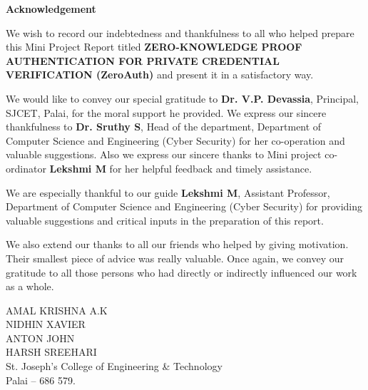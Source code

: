 \newpage
\thispagestyle{empty}
\begin{center}
{\LARGE\textbf{Acknowledgement}}\\[1cm]
\end{center}

We wish to record our indebtedness and thankfulness to all who helped prepare this Mini Project Report titled \textbf{ZERO-KNOWLEDGE PROOF AUTHENTICATION FOR PRIVATE CREDENTIAL VERIFICATION (ZeroAuth)} and present it in a satisfactory way.

We would like to convey our special gratitude to \textbf{Dr. V.P. Devassia}, Principal, SJCET, Palai, for the moral support he provided. We express our sincere thankfulness to \textbf{Dr. Sruthy S}, Head of the department, Department of Computer Science and Engineering (Cyber Security) for her co-operation and valuable suggestions. Also we express our sincere thanks to Mini project co-ordinator \textbf{Lekshmi M} for her helpful feedback and timely assistance.

We are especially thankful to our guide \textbf{Lekshmi M}, Assistant Professor, Department of Computer Science and Engineering (Cyber Security) for providing valuable suggestions and critical inputs in the preparation of this report.

We also extend our thanks to all our friends who helped by giving motivation. Their smallest piece of advice was really valuable. Once again, we convey our gratitude to all those persons who had directly or indirectly influenced our work as a whole.

\vspace{2cm}
\begin{flushright}
AMAL KRISHNA A.K\\
NIDHIN XAVIER\\
ANTON JOHN\\
HARSH SREEHARI\\[1cm]
St. Joseph's College of Engineering \& Technology\\
Palai -- 686 579.
\end{flushright}
